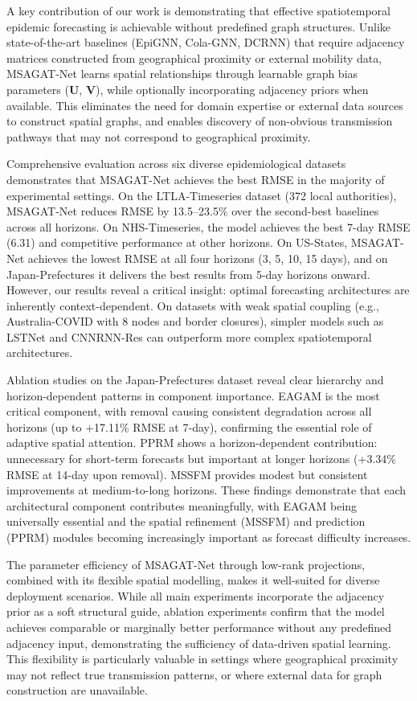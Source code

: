 \documentclass[a4paper,fleqn]{cas-dc}
\begin{document}
A key contribution of our work is demonstrating that effective spatiotemporal epidemic forecasting is achievable without predefined graph structures. Unlike state-of-the-art baselines (EpiGNN, Cola-GNN, DCRNN) that require adjacency matrices constructed from geographical proximity or external mobility data, MSAGAT-Net learns spatial relationships through learnable graph bias parameters ($\mathbf{U}$, $\mathbf{V}$), while optionally incorporating adjacency priors when available. This eliminates the need for domain expertise or external data sources to construct spatial graphs, and enables discovery of non-obvious transmission pathways that may not correspond to geographical proximity.

Comprehensive evaluation across six diverse epidemiological datasets demonstrates that MSAGAT-Net achieves the best RMSE in the majority of experimental settings. On the LTLA-Timeseries dataset (372 local authorities), MSAGAT-Net reduces RMSE by 13.5--23.5\% over the second-best baselines across all horizons. On NHS-Timeseries, the model achieves the best 7-day RMSE (6.31) and competitive performance at other horizons. On US-States, MSAGAT-Net achieves the lowest RMSE at all four horizons (3, 5, 10, 15 days), and on Japan-Prefectures it delivers the best results from 5-day horizons onward. However, our results reveal a critical insight: optimal forecasting architectures are inherently context-dependent. On datasets with weak spatial coupling (e.g., Australia-COVID with 8 nodes and border closures), simpler models such as LSTNet and CNNRNN-Res can outperform more complex spatiotemporal architectures.

Ablation studies on the Japan-Prefectures dataset reveal clear hierarchy and horizon-dependent patterns in component importance. EAGAM is the most critical component, with removal causing consistent degradation across all horizons (up to +17.11\% RMSE at 7-day), confirming the essential role of adaptive spatial attention. PPRM shows a horizon-dependent contribution: unnecessary for short-term forecasts but important at longer horizons (+3.34\% RMSE at 14-day upon removal). MSSFM provides modest but consistent improvements at medium-to-long horizons. These findings demonstrate that each architectural component contributes meaningfully, with EAGAM being universally essential and the spatial refinement (MSSFM) and prediction (PPRM) modules becoming increasingly important as forecast difficulty increases.

The parameter efficiency of MSAGAT-Net through low-rank projections, combined with its flexible spatial modelling, makes it well-suited for diverse deployment scenarios. While all main experiments incorporate the adjacency prior as a soft structural guide, ablation experiments confirm that the model achieves comparable or marginally better performance without any predefined adjacency input, demonstrating the sufficiency of data-driven spatial learning. This flexibility is particularly valuable in settings where geographical proximity may not reflect true transmission patterns, or where external data for graph construction are unavailable.
\end{document}
